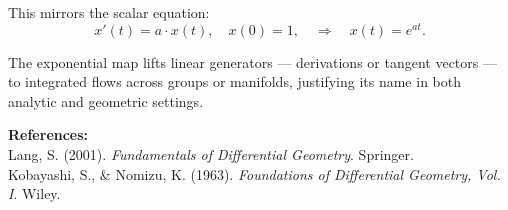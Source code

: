 \begin{technical}
This mirrors the scalar equation:
\[
x'(t) = a \cdot x(t), \quad 
x(0) = 1, \quad 
\Rightarrow \quad 
x(t) = e^{at}.
\]

The exponential map lifts linear generators — derivations or tangent vectors — to integrated flows across groups or manifolds, justifying its name in both analytic and geometric settings.

\vspace{0.5em}
\noindent\textbf{References:}\\
Lang, S. (2001). \textit{Fundamentals of Differential Geometry}. Springer.\\
Kobayashi, S., \& Nomizu, K. (1963). \textit{Foundations of Differential Geometry, Vol. I}. Wiley.
\end{technical}
